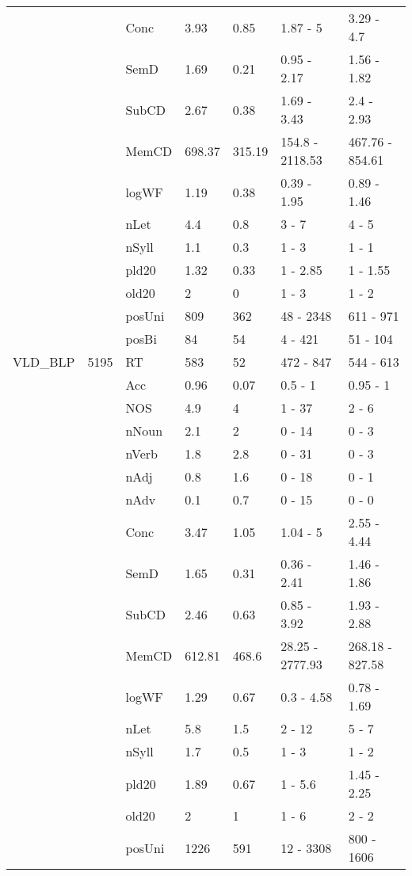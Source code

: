 \begin{table}[ht]
\begin{tabular}{lllllll}
   &  & Conc & 3.93 & 0.85 & 1.87 - 5 & 3.29 - 4.7 \\ 
   &  & SemD & 1.69 & 0.21 & 0.95 - 2.17 & 1.56 - 1.82 \\ 
   &  & SubCD & 2.67 & 0.38 & 1.69 - 3.43 & 2.4 - 2.93 \\ 
   &  & MemCD & 698.37 & 315.19 & 154.8 - 2118.53 & 467.76 - 854.61 \\ 
   &  & logWF & 1.19 & 0.38 & 0.39 - 1.95 & 0.89 - 1.46 \\ 
   &  & nLet & 4.4 & 0.8 & 3 - 7 & 4 - 5 \\ 
   &  & nSyll & 1.1 & 0.3 & 1 - 3 & 1 - 1 \\ 
   &  & pld20 & 1.32 & 0.33 & 1 - 2.85 & 1 - 1.55 \\ 
   &  & old20 & 2 & 0 & 1 - 3 & 1 - 2 \\ 
   &  & posUni & 809 & 362 & 48 - 2348 & 611 - 971 \\ 
   &  & posBi & 84 & 54 & 4 - 421 & 51 - 104 \\ 
  VLD\_BLP & 5195 & RT & 583 & 52 & 472 - 847 & 544 - 613 \\ 
   &  & Acc & 0.96 & 0.07 & 0.5 - 1 & 0.95 - 1 \\ 
   &  & NOS & 4.9 & 4 & 1 - 37 & 2 - 6 \\ 
   &  & nNoun & 2.1 & 2 & 0 - 14 & 0 - 3 \\ 
   &  & nVerb & 1.8 & 2.8 & 0 - 31 & 0 - 3 \\ 
   &  & nAdj & 0.8 & 1.6 & 0 - 18 & 0 - 1 \\ 
   &  & nAdv & 0.1 & 0.7 & 0 - 15 & 0 - 0 \\ 
   &  & Conc & 3.47 & 1.05 & 1.04 - 5 & 2.55 - 4.44 \\ 
   &  & SemD & 1.65 & 0.31 & 0.36 - 2.41 & 1.46 - 1.86 \\ 
   &  & SubCD & 2.46 & 0.63 & 0.85 - 3.92 & 1.93 - 2.88 \\ 
   &  & MemCD & 612.81 & 468.6 & 28.25 - 2777.93 & 268.18 - 827.58 \\ 
   &  & logWF & 1.29 & 0.67 & 0.3 - 4.58 & 0.78 - 1.69 \\ 
   &  & nLet & 5.8 & 1.5 & 2 - 12 & 5 - 7 \\ 
   &  & nSyll & 1.7 & 0.5 & 1 - 3 & 1 - 2 \\ 
   &  & pld20 & 1.89 & 0.67 & 1 - 5.6 & 1.45 - 2.25 \\ 
   &  & old20 & 2 & 1 & 1 - 6 & 2 - 2 \\ 
   &  & posUni & 1226 & 591 & 12 - 3308 & 800 - 1606 \\ 

\end{tabular}
\end{table}
